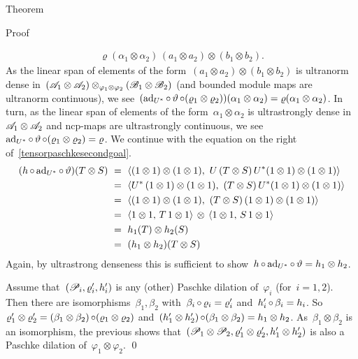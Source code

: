 \documentclass[b]{subfiles}
\begin{document}
\begin{parsec}
\begin{point}{Theorem}
\begin{point}{Proof}
\begin{point}
\begin{align*}
    \varrho(\alpha_1 \otimes\alpha_2) \,(a_1 \otimes a_2) \otimes (b_1 \otimes b_2).
\end{align*}
As the linear span of
    elements of the form~$(a_1 \otimes a_2) \otimes (b_1 \otimes b_2)$
    is ultranorm dense in~$(\mathscr{A}_1 \otimes \mathscr{A}_2)
                            \otimes_{\varphi_1 \otimes \varphi_2}
                            (\mathscr{B}_1 \otimes \mathscr{B}_2) $
                (and bounded module maps are ultranorm continuous),
    we see~$(\mathrm{ad}_{U^*} \mathop{\circ} \vartheta \mathop{\circ} (\varrho_1 \otimes \varrho_2))
            (\alpha_1 \otimes \alpha_2)
            = \varrho(\alpha_1 \otimes \alpha_2)$.
In turn, as the linear span of elements of the form~$\alpha_1 \otimes \alpha_2$
    is ultrastrongly dense in~$\mathscr{A}_1 \otimes \mathscr{A}_2$
    and ncp-maps are ultrastrongly continuous,
    we see~$\mathrm{ad}_{U^*} \mathop{\circ} \vartheta \mathop{\circ} (\varrho_1 \otimes \varrho_2) =
        \varrho$.
        We continue with the equation on the right
        of~\eqref{tensorpaschkesecondgoal}.
\begin{align*}
    (h \mathop{\circ} \mathrm{ad}_{U^*} \mathop{\circ} \vartheta) (T \otimes S)
        & \ = \ \langle (1 \otimes 1) \otimes (1 \otimes 1),
                        \ U\, (T \otimes S)\, U^*(1 \otimes 1) \otimes (1 \otimes 1)
                        \rangle \\
        & \ = \ \langle U^* \,(1 \otimes 1) \otimes (1 \otimes 1),
                        \  (T \otimes S)\, U^*(1 \otimes 1) \otimes (1 \otimes 1)
                        \rangle \\
        & \ = \ \langle (1 \otimes 1) \otimes (1 \otimes 1),
                        \  (T \otimes S)\, (1 \otimes 1) \otimes (1 \otimes 1)
                        \rangle \\
        & \ = \
        \langle 1 \otimes 1, \,T\, 1\otimes 1\rangle \,\otimes\,
        \langle 1 \otimes 1, \,S\, 1\otimes 1\rangle \\
        & \ = \
        h_1(T) \otimes h_2(S) \\
        & \ = \
        (h_1\otimes h_2)(T \otimes S)
\end{align*}
Again, by ultrastrong denseness this
is sufficient to show~$h \mathop{\circ} \mathrm{ad}_{U^*} \mathop{\circ} \vartheta = h_1 \otimes h_2$.
\end{point}
\begin{point}%
Assume that~$(\mathscr{P}_i, \varrho_i', h_i')$
    is any (other) Paschke dilation of~$\varphi_i$ (for~$i=1,2$).
Then there are isomorphisms~$\beta_1,\beta_2$
    with~$\beta_i \mathop{\circ} \varrho_i = \varrho_i'$
    and~$h_i' \mathop{\circ} \beta_i = h_i$.
So~$\varrho'_1 \otimes \varrho'_2
        = (\beta_1 \otimes \beta_2) \mathop{\circ} (\varrho_1 \otimes \varrho_2)$
        and~$(h_1' \otimes h_2') \mathop{\circ} (\beta_1 \otimes \beta_2) = h_1 \otimes h_2$.
As~$\beta_1 \otimes \beta_2$ is an isomorphism,
    the previous shows that~$(\mathscr{P}_1 \otimes \mathscr{P}_2, \varrho_1' \otimes \varrho_2', h_1' \otimes h_2')$ is also a Paschke dilation of~$\varphi_1 \otimes \varphi_2$. \qed
\end{point}
\end{point}
\end{point}
\end{parsec}
\end{document}
